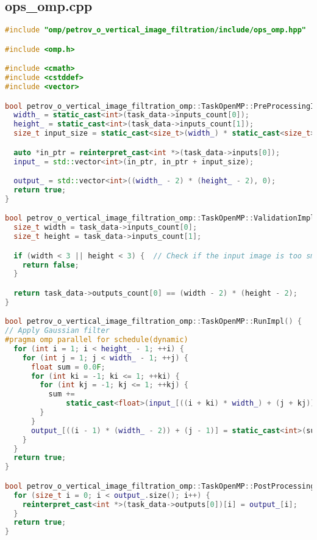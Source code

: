 \documentclass[12pt,a4paper]{extarticle}
\begin{document}
\subsection{ops\_omp.cpp}
\begin{lstlisting}[language=C++]
#include "omp/petrov_o_vertical_image_filtration/include/ops_omp.hpp"

#include <omp.h>

#include <cmath>
#include <cstddef>
#include <vector>

bool petrov_o_vertical_image_filtration_omp::TaskOpenMP::PreProcessingImpl() {
  width_ = static_cast<int>(task_data->inputs_count[0]);
  height_ = static_cast<int>(task_data->inputs_count[1]);
  size_t input_size = static_cast<size_t>(width_) * static_cast<size_t>(height_);

  auto *in_ptr = reinterpret_cast<int *>(task_data->inputs[0]);
  input_ = std::vector<int>(in_ptr, in_ptr + input_size);

  output_ = std::vector<int>((width_ - 2) * (height_ - 2), 0);
  return true;
}

bool petrov_o_vertical_image_filtration_omp::TaskOpenMP::ValidationImpl() {
  size_t width = task_data->inputs_count[0];
  size_t height = task_data->inputs_count[1];

  if (width < 3 || height < 3) {  // Check if the input image is too small
    return false;
  }

  return task_data->outputs_count[0] == (width - 2) * (height - 2);
}

bool petrov_o_vertical_image_filtration_omp::TaskOpenMP::RunImpl() {
// Apply Gaussian filter
#pragma omp parallel for schedule(dynamic)
  for (int i = 1; i < height_ - 1; ++i) {
    for (int j = 1; j < width_ - 1; ++j) {
      float sum = 0.0F;
      for (int ki = -1; ki <= 1; ++ki) {
        for (int kj = -1; kj <= 1; ++kj) {
          sum +=
              static_cast<float>(input_[((i + ki) * width_) + (j + kj)]) * gaussian_kernel_[((ki + 1) * 3) + (kj + 1)];
        }
      }
      output_[((i - 1) * (width_ - 2)) + (j - 1)] = static_cast<int>(sum);
    }
  }
  return true;
}

bool petrov_o_vertical_image_filtration_omp::TaskOpenMP::PostProcessingImpl() {
  for (size_t i = 0; i < output_.size(); i++) {
    reinterpret_cast<int *>(task_data->outputs[0])[i] = output_[i];
  }
  return true;
}
\end{lstlisting}
\end{document}

